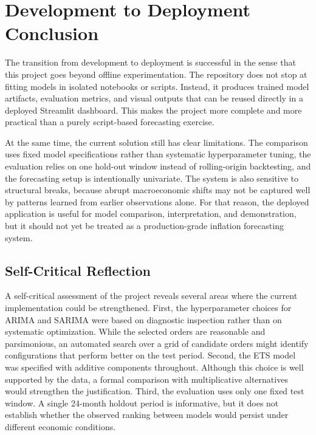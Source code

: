 %
%
%

\chapter{Development to Deployment Conclusion}

The transition from development to deployment is successful in the sense that this project goes beyond offline experimentation. The repository does not stop at fitting models in isolated notebooks or scripts. Instead, it produces trained model artifacts, evaluation metrics, and visual outputs that can be reused directly in a deployed Streamlit dashboard. This makes the project more complete and more practical than a purely script-based forecasting exercise.

At the same time, the current solution still has clear limitations. The comparison uses fixed model specifications rather than systematic hyperparameter tuning, the evaluation relies on one hold-out window instead of rolling-origin backtesting, and the forecasting setup is intentionally univariate. The system is also sensitive to structural breaks, because abrupt macroeconomic shifts may not be captured well by patterns learned from earlier observations alone. For that reason, the deployed application is useful for model comparison, interpretation, and demonstration, but it should not yet be treated as a production-grade inflation forecasting system.

\section{Self-Critical Reflection}

A self-critical assessment of the project reveals several areas where the current implementation could be strengthened. First, the hyperparameter choices for ARIMA and SARIMA were based on diagnostic inspection rather than on systematic optimization. While the selected orders are reasonable and parsimonious, an automated search over a grid of candidate orders might identify configurations that perform better on the test period. Second, the ETS model was specified with additive components throughout. Although this choice is well supported by the data, a formal comparison with multiplicative alternatives would strengthen the justification. Third, the evaluation uses only one fixed test window. A single 24-month holdout period is informative, but it does not establish whether the observed ranking between models would persist under different economic conditions.

